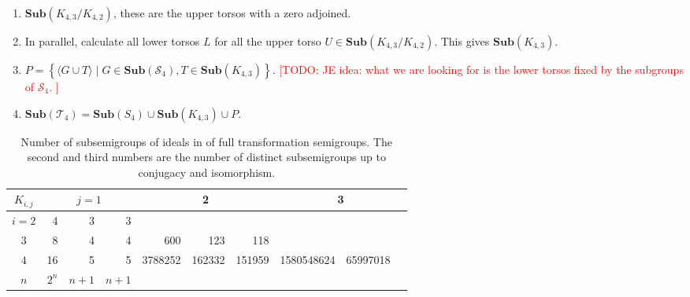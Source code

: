 \documentclass{amsart}
\newcommand{\cT}{{\mathcal T}}
\newcommand{\cS}{{\mathcal S}}
\newcommand{\Sub}{\mathbf{Sub}}
\newcommand{\todo}[1]{\textcolor{red}{ \small \textsf{[TODO:  #1 ]} \normalsize}}
\theoremstyle{plain}
\theoremstyle{definition}
\begin{document}
\begin{enumerate}
\item $\Sub(K_{4,3}/K_{4,2})$, these are the upper torsos with a zero adjoined.
\item In parallel, calculate all lower torsos $L$ for all the upper torso $U\in \Sub(K_{4,3}/K_{4,2})$. This gives $\Sub(K_{4,3})$.
\item $P=\left\{\langle G\cup T\rangle\mid G\in\Sub(\cS_4), T\in\Sub(K_{4,3})\right\}$. \todo{JE idea: what we are looking for is the lower torsos fixed by the subgroups of $\cS_4$.}
\item $\Sub(\cT_4)=\Sub(S_4)\cup\Sub(K_{4,3})\cup P$.
\end{enumerate}

\begin{table}
\renewcommand{\tabcolsep}{2pt}
\renewcommand{\arraystretch}{1}
\begin{tabular}{|c|r|r|r||r|r|r||r|r|r|}
\hline
$K_{i,j}$ & \multicolumn{3}{c||}{$j=1$} & \multicolumn{3}{c||}{2} & \multicolumn{3}{c|}{3} \\
\hline
$i=2$ & 4&3&3   & \cellcolor{gray9}  & \cellcolor{gray9}&  \cellcolor{gray9} & \cellcolor{gray9}  &\cellcolor{gray9} &\cellcolor{gray9}\\
\hline
$3$ &  8&4&4  &  600 & 123 & 118  & \cellcolor{gray9}  & \cellcolor{gray9}&\cellcolor{gray9}\\
\hline
$4$ & 16&5&5  &  3788252 & 162332 & 151959  & 1580548624  & 65997018&\\
\hline
$n$ & $2^n$&$n+1$&$n+1$    &    & &    &    & & \\
\hline

\end{tabular}
\caption{Number of subsemigroups of ideals in of full transformation semigroups. The second and third numbers are the number of distinct subsemigroups up to conjugacy and isomorphism.}
\end{table}
\end{document}
